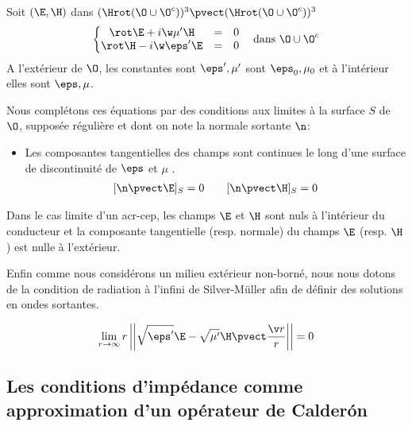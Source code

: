 Soit $(\E,\H)$ dans $(\Hrot(\O\cup\O^c))^3 \pvect (\Hrot(\O\cup\O^c))^3$
\begin{equation}
  \label{eq:pres_th:intro:maxwell}
  \left\lbrace \begin{matrix}
  \rot \E + i\w\mu' \H &=& 0 \\
  \rot \H - i\w\eps' \E &=& 0 \\
  \end{matrix} \right. \quad \text{dans $\O\cup\O^c$}
\end{equation}
A l'extérieur de $\O$, les constantes sont $\eps',\mu'$ sont $\eps_0,\mu_0$ et à l'intérieur elles sont $\eps,\mu$.

Nous complétons ces équations par des conditions aux limites à la surface $S$ de $\O$, supposée régulière et dont on note la normale sortante $\n$:
\begin{itemize}
  \item Les composantes tangentielles des champs sont continues le long d'une surface de discontinuité de $\eps$ et $\mu$ \cite[(2.10) p.~8]{senior_approximate_1995}.
\begin{align}
  \label{eq:pres_th:intro:transmissions}[\n \pvect \E]_S = 0  \qquad [\n \pvect \H]_S = 0
\end{align}
\end{itemize}
Dans le cas limite d'un \gls{acr-cep}, les champs $\E$ et $\H$ sont nuls à l'intérieur du conducteur et la composante tangentielle (resp. normale) du champs $\E$ (resp. $\H$) est nulle à l'extérieur.

Enfin comme nous considérons un milieu extérieur non-borné, nous nous dotons de la condition de radiation à l'infini de Silver-Müller afin de définir des solutions en ondes sortantes.

\begin{equation}
  \label{eq:pres_th:intro:silver-muller}
  \lim_{r\rightarrow\infty}r\left|\left|\sqrt{\eps'}\E - \sqrt{\mu'}\H\pvect\frac{\v r}{r}\right|\right| = 0
\end{equation} 

\subsection*{Les conditions d'impédance comme approximation d'un opérateur de Calderón}

